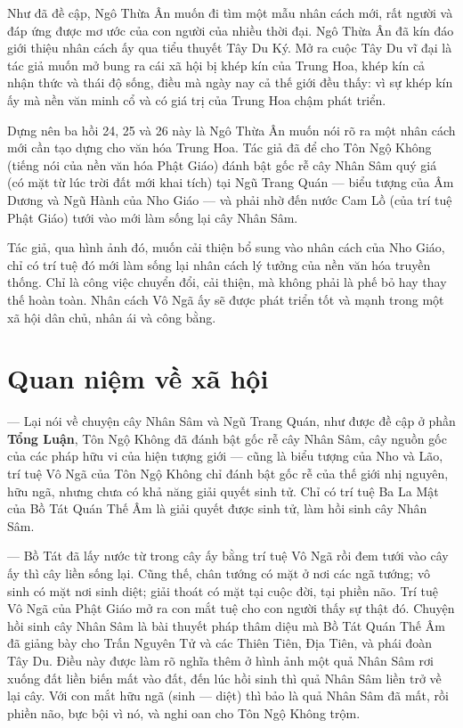 Như đã đề cập, Ngô Thừa Ân muốn đi tìm một mẫu nhân cách mới, rất người và đáp ứng được mơ ước của con người của nhiều thời đại. Ngô Thừa Ân đã kín đáo giới thiệu nhân cách ấy qua tiểu thuyết Tây Du Ký. Mở ra cuộc Tây Du vĩ đại là tác giả muốn mở bung ra cái xã hội bị khép kín của Trung Hoa, khép kín cả nhận thức và thái độ sống, điều mà ngày nay cả thế giới đều thấy: vì sự khép kín ấy mà nền văn minh cổ và có giá trị của Trung Hoa chậm phát triển.

Dựng nên ba hồi 24, 25 và 26 này là Ngô Thừa Ân muốn nói rõ ra một nhân cách mới cần tạo dựng cho văn hóa Trung Hoa. Tác giả đã để cho Tôn Ngộ Không (tiếng nói của nền văn hóa Phật Giáo) đánh bật gốc rễ cây Nhân Sâm quý giá (có mặt từ lúc trời đất mới khai tích) tại Ngũ Trang Quán — biểu tượng của Âm Dương và Ngũ Hành của Nho Giáo — và phải nhờ đến nước Cam Lồ (của trí tuệ Phật Giáo) tưới vào mới làm sống lại cây Nhân Sâm.

Tác giả, qua hình ảnh đó, muốn cải thiện bổ sung vào nhân cách của Nho Giáo, chỉ có trí tuệ đó mới làm sống lại nhân cách lý tưởng của nền văn hóa truyền thống. Chỉ là công việc chuyển đổi, cải thiện, mà không phải là phế bỏ hay thay thế hoàn toàn. Nhân cách Vô Ngã ấy sẽ được phát triển tốt và mạnh trong một xã hội dân chủ, nhân ái và công bằng.

\section{Quan niệm về xã hội} %
\label{sec:24_25_26_xa_hoi}

— Lại nói về chuyện cây Nhân Sâm và Ngũ Trang Quán, như được đề cập ở phần {\bf Tổng Luận}, Tôn Ngộ Không đã đánh bật gốc rễ cây Nhân Sâm, cây nguồn gốc của các pháp hữu vi của hiện tượng giới — cũng là biểu tượng của Nho và Lão, trí tuệ Vô Ngã của Tôn Ngộ Không chỉ đánh bật gốc rễ của thế giới nhị nguyên, hữu ngã, nhưng chưa có khả năng giải quyết sinh tử. Chỉ có trí tuệ Ba La Mật của Bồ Tát Quán Thế Âm là giải quyết được sinh tử, làm hồi sinh cây Nhân Sâm.

— Bồ Tát đã lấy nước từ trong cây ấy bằng trí tuệ Vô Ngã rồi đem tưới vào cây ấy thì cây liền sống lại. Cũng thế, chân tướng có mặt ở nơi các ngã tướng; vô sinh có mặt nơi sinh diệt; giải thoát có mặt tại cuộc đời, tại phiền não. Trí tuệ Vô Ngã của Phật Giáo mở ra con mắt tuệ cho con người thấy sự thật đó. Chuyện hồi sinh cây Nhân Sâm là bài thuyết pháp thâm diệu mà Bồ Tát Quán Thế Âm đã giảng bày cho Trấn Nguyên Tử và các Thiên Tiên, Địa Tiên, và phái đoàn Tây Du. Điều này được làm rõ nghĩa thêm ở hình ảnh một quả Nhân Sâm rơi xuống đất liền biến mất vào đất, đến lúc hồi sinh thì quả Nhân Sâm liền trở về lại cây. Với con mắt hữu ngã (sinh — diệt) thì bảo là quả Nhân Sâm đã mất, rồi phiền não, bực bội vì nó, và nghi oan cho Tôn Ngộ Không trộm.

